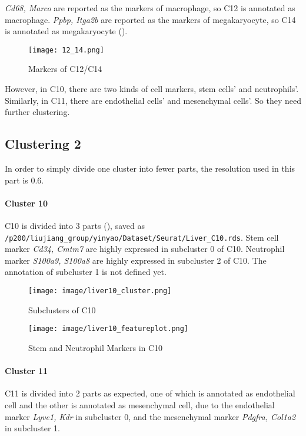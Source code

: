 \documentclass[lang=en]{elegantpaper}
\begin{document}
\emph{Cd68, Marco} are reported as the markers of macrophage\citep{su_single-cell_2017, han_mapping_2018}, so C12 is annotated as macrophage. \emph{Ppbp, Itga2b} are reported as the markers of megakaryocyte\citep{su_single-cell_2017}, so C14 is annotated as megakaryocyte ().

\begin{figure}[htbp]
    \centering
    \texttt{[image: 12\_14.png]}
    \caption{Markers of C12/C14 \label{12_14}}
\end{figure}

However, in C10, there are two kinds of cell markers, stem cells' and neutrophils'. Similarly, in C11, there are endothelial cells' and mesenchymal cells'. So they need further clustering.

\subsection{Clustering 2}

In order to simply divide one cluster into fewer parts, the resolution used in this part is 0.6. 

\paragraph{Cluster 10} C10 is divided into 3 parts (), saved as \lstinline{/p200/liujiang_group/yinyao/Dataset/Seurat/Liver_C10.rds}. Stem cell marker \emph{Cd34, Cmtm7}\citep{han_mapping_2018} are highly expressed in subcluster 0 of C10. Neutrophil marker \emph{S100a9, S100a8}\citep{han_mapping_2018} are highly expressed in subcluster 2 of C10. The annotation of subcluster 1 is not defined yet.

\begin{figure}[htbp]
    \begin{minipage}[htbp]{0.5\textwidth}
        \centering
        \texttt{[image: image/liver10\_cluster.png]}
        \caption{Subclusters of C10 \label{10_clus}}
    \end{minipage}
    \begin{minipage}[htbp]{0.5\textwidth}
        \centering
        \texttt{[image: image/liver10\_featureplot.png]}
        \caption{Stem and Neutrophil Markers in C10 \label{10_feat}}
    \end{minipage}
\end{figure}

\paragraph{Cluster 11} C11 is divided into 2 parts as expected, one of which is annotated as endothelial cell and the other is annotated as mesenchymal cell, due to the endothelial marker \emph{Lyve1, Kdr}\citep{gordillo_orchestrating_2015} in subcluster 0, and the mesenchymal marker \emph{Pdgfra, Col1a2}\citep{han_mapping_2018} in subcluster 1.\citep{}
\end{document}

